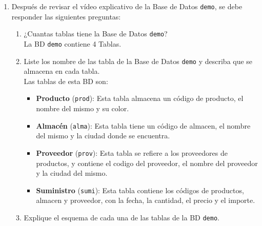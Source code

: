 \begin{enumerate}
\item Después de revisar el vídeo explicativo de la Base de Datos \texttt{demo}, se debe responder las siguientes preguntas:
\begin{enumerate}
\item ¿Cuantas tablas tiene la Base de Datos \texttt{demo}? \\
La BD \texttt{demo} contiene 4 Tablas. \\
\item Liste los nombre de las tabla de la Base de Datos \texttt{demo} y describa que se almacena en cada tabla. \\
Las tablas de esta BD son:
\begin{itemize}
\item \textbf{Producto} (\texttt{prod}): Esta tabla almacena un código de producto, el nombre del mismo y su color.
\item \textbf{Almacén} (\texttt{alma}): Esta tabla tiene un código de almacen, el nombre del mismo y la ciudad donde se encuentra.
\item \textbf{Proveedor} (\texttt{prov}): Esta tabla se refiere a los proveedores de productos, y contiene el codigo del proveedor, el nombre del proveedor y la ciudad del mismo.
\item \textbf{Suministro} (\texttt{sumi}): Esta tabla contiene los códigos de productos, almacen y proveedor, con la fecha, la cantidad, el precio y el importe.\\{}
\end{itemize} 

\item Explique el esquema de cada una de las tablas de la BD \texttt{demo}.


\end{enumerate}
\end{enumerate}
